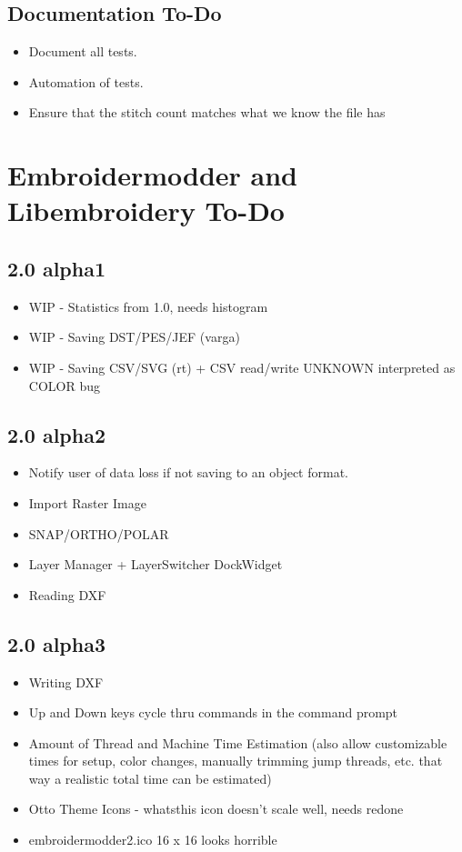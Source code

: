\documentclass[10pt]{report}
\begin{document}
\subsection{Documentation To-Do}

\begin{itemize}
\item Document all tests.
\item Automation of tests.
\item Ensure that the stitch count matches what we know the file has
\end{itemize}

\section{Embroidermodder and Libembroidery To-Do}

\subsection{2.0 alpha1}

\begin{itemize}
\item WIP - Statistics from 1.0, needs histogram
\item WIP - Saving DST/PES/JEF (varga)
\item WIP - Saving CSV/SVG (rt) + CSV read/write UNKNOWN interpreted as COLOR bug
\end{itemize}

\subsection{2.0 alpha2}

\begin{itemize}
\item Notify user of data loss if not saving to an object format.
\item Import Raster Image
\item SNAP/ORTHO/POLAR
\item Layer Manager + LayerSwitcher DockWidget
\item Reading DXF
\end{itemize}

\subsection{2.0 alpha3}

\begin{itemize}
\item Writing DXF
\item Up and Down keys cycle thru commands in the command prompt
\item Amount of Thread and Machine Time Estimation (also allow customizable times for setup, color changes, manually trimming jump threads, etc. that way a realistic total time can be estimated)
\item Otto Theme Icons - whatsthis icon doesn't scale well, needs redone
\item embroidermodder2.ico 16 x 16 looks horrible
\end{itemize}
\end{document}
